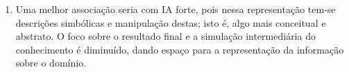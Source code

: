 \documentclass{../../sftex/sftex}
\begin{document}
\begin{enumerate}[label= (\textbf{\arabic*})]
\begin{enumerate}
        \end{enumerate}

    \item Uma melhor associação seria com IA forte, pois nessa representação
        tem-se descrições simbólicas e manipulação destas; isto é, algo mais
        conceitual e abstrato. O foco sobre o resultado final e a simulação
        intermediária do conhecimento é diminuído, dando espaço para a
        representação da informação sobre o domínio.

\end{enumerate}



\end{document}

